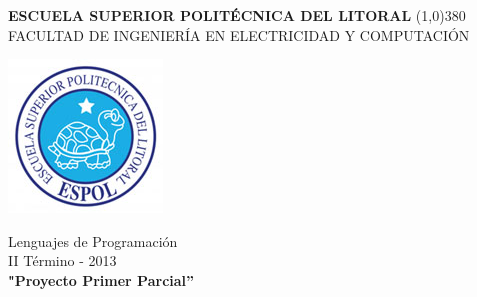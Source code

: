 \documentclass[a4paper,11pt]{article}
\begin{document}
\setlength{\topmargin}{-0,2in}


\vspace*{\fill}
			\begin{center}
				\textbf{
					\vspace{-0.7em}
					ESCUELA SUPERIOR POLITÉCNICA DEL LITORAL
				}
				\line(1,0){380}\\		
				\scriptsize{FACULTAD DE INGENIERÍA EN ELECTRICIDAD Y COMPUTACIÓN}
				
				\vspace{2.5em}
				\includegraphics[scale=0.5]{image_buscamina/espol.jpg} 
			\end{center}
			
			\begin{center}
				\vspace{2.5em}
				Lenguajes de Programación
				\\II Término - 2013\\
				\vspace{3.5em}  %
				\textbf{"Proyecto Primer Parcial''}
				\vspace{5em}
			\end{center}	

\vspace*{\fill}
\newpage 

\tableofcontents

\newpage

\end{document}
